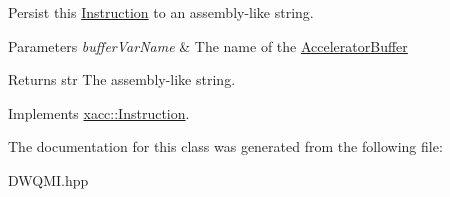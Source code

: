 Persist this \hyperlink{a01155}{Instruction} to an assembly-\/like string.


\begin{DoxyParams}{Parameters}
{\em buffer\+Var\+Name} & The name of the \hyperlink{a01123}{Accelerator\+Buffer} \\
\hline
\end{DoxyParams}
\begin{DoxyReturn}{Returns}
str The assembly-\/like string. 
\end{DoxyReturn}


Implements \hyperlink{a01155_ae94c2d089908294c1d410b14c96817ae}{xacc\+::\+Instruction}.



The documentation for this class was generated from the following file\+:\begin{DoxyCompactItemize}
\item 
D\+W\+Q\+M\+I.\+hpp\end{DoxyCompactItemize}
